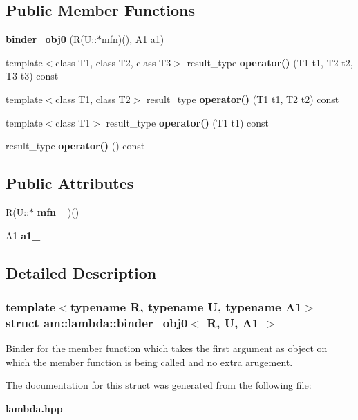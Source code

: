 \subsection*{Public Member Functions}
\begin{CompactItemize}
\item 
\textbf{binder\_\-obj0} (R(U::$\ast$mfn)(), A1 a1)\label{structam_1_1lambda_1_1binder__obj0_5e96ad5ca1d04e03da591cdea124d409}

\item 
template$<$class T1, class T2, class T3$>$ result\_\-type \textbf{operator()} (T1 t1, T2 t2, T3 t3) const \label{structam_1_1lambda_1_1binder__obj0_a23d8ff86f058507f9af835688bc2409}

\item 
template$<$class T1, class T2$>$ result\_\-type \textbf{operator()} (T1 t1, T2 t2) const\label{structam_1_1lambda_1_1binder__obj0_a65a5695f175b8a63dcf0bb0593fb5d7}

\item 
template$<$class T1$>$ result\_\-type \textbf{operator()} (T1 t1) const \label{structam_1_1lambda_1_1binder__obj0_aa339943e2336100293ab098a837dd17}

\item 
result\_\-type \textbf{operator()} () const\label{structam_1_1lambda_1_1binder__obj0_99a0ee62fea6581e6599843168c81cb8}

\end{CompactItemize}
\subsection*{Public Attributes}
\begin{CompactItemize}
\item 
R(U::$\ast$ \textbf{mfn\_\-} )()\label{structam_1_1lambda_1_1binder__obj0_11d31750a5f862314ea7e710f4e3e06a}

\item 
A1 \textbf{a1\_\-}\label{structam_1_1lambda_1_1binder__obj0_e37004bd4caeb629f6e288f050aa67f6}

\end{CompactItemize}


\subsection{Detailed Description}
\subsubsection*{template$<$typename R, typename U, typename A1$>$ struct am::lambda::binder\_\-obj0$<$ R, U, A1 $>$}

Binder for the member function which takes the first argument as object on which the member function is being called and no extra arugement. 



The documentation for this struct was generated from the following file:\begin{CompactItemize}
\item 
{\bf lambda.hpp}\end{CompactItemize}
